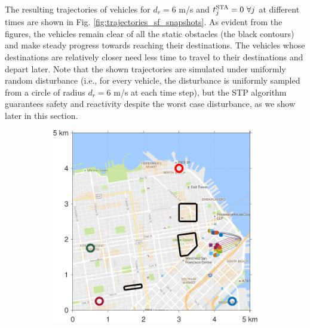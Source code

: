 The resulting trajectories of vehicles for $d_{r} = 6$ m/s and $t^\text{STA}_j = 0 ~ \forall j$ at different times are shown in Fig. \ref{fig:trajectories_sf_snapshots}. As evident from the figures, the vehicles remain clear of all the static obstacles (the black contours) and make steady progress towards reaching their destinations. The vehicles whose destinations are relatively closer need less time to travel to their destinations and depart later. Note that the shown trajectories are simulated under uniformly random disturbance (i.e., for every vehicle, the disturbance is uniformly sampled from a circle of radius $d_{r} = 6$ m/s at each time step), but the STP algorithm guarantees safety and reactivity despite the worst case disturbance, as we show later in this section.
%
\begin{figure}[!htb]
 \centering
\begin{subfigure}{0.5\textwidth}
  \includegraphics[width=\columnwidth]{figs/sf_d6sep0_s1}
  \subcaption{}
  \label{fig:sf_d6sep0_s1}
\end{subfigure}%
\begin{subfigure}{0.5\textwidth}

\end{subfigure}
\end{figure}
